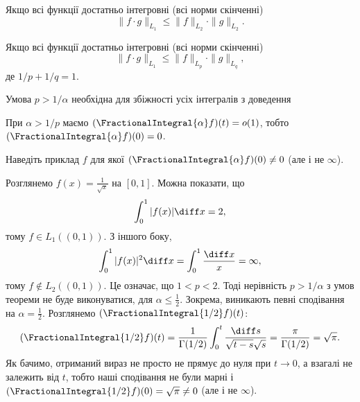 \begin{remark}
    Якщо всі функції достатньо інтегровні (всі норми скінченні)
    \begin{equation}
        \|f \cdot g\|_{L_1} \le \|f\|_{L_2} \cdot \|g\|_{L_2}.  
    \end{equation}
\end{remark}

\begin{remark}
    Якщо всі функції достатньо інтегровні (всі норми скінченні)
    \begin{equation}
        \|f \cdot g\|_{L_1} \le \|f\|_{L_p} \cdot \|g\|_{L_q},  
    \end{equation}
    де $1 / p + 1 / q = 1$.
\end{remark}

\begin{remark}
    Умова $p > 1 / \alpha$ необхідна для збіжності усіх інтегралів з доведення
\end{remark}

\begin{corollary}
    При $\alpha > 1 / p$ маємо $(\FractionalIntegral{\alpha} f)(t) = o(1)$, тобто $(\FractionalIntegral{\alpha} f)(0) = 0$.
\end{corollary}

\begin{exercise}
    Наведіть приклад $f$ для якої $(\FractionalIntegral{\alpha} f)(0) \ne 0$ (але і не $\infty$).
\end{exercise}
\begin{solution}
    \begin{example}
        Розглянемо $f(x) = \frac{1}{\sqrt{x}}$ на $[0,1]$. Можна показати, що
        \begin{equation}
            \int_0^1 |f(x)| \diff x = 2,
        \end{equation}
        тому $f \in L_1((0,1))$. З іншого боку,
        \begin{equation}
            \int_0^1 |f(x)|^2 \diff x = \int_0^1 \frac{\diff x}{x} = \infty,
        \end{equation}
        тому $f \not\in L_2((0,1))$. Це означає, що $1 < p < 2$. Тоді нерівність $p > 1 / \alpha$ з умов теореми не буде виконуватися, для $\alpha \le \frac{1}{2}$. Зокрема, виникають певні сподівання на $\alpha = \frac{1}{2}$. Розглянемо $(\FractionalIntegral{1/2}f)(t)$:
        \begin{equation}
            (\FractionalIntegral{1/2}f)(t) = \frac{1}{\Gamma(1/2)} \int_0^t \frac{\diff s}{\sqrt{t - s} \sqrt{s}} = \frac{\pi}{\Gamma(1/2)} = \sqrt{\pi}.
        \end{equation}
        Як бачимо, отриманий вираз не просто не прямує до нуля при $t \to 0$, а взагалі не залежить від $t$, тобто наші сподівання не були марні і $(\FractionalIntegral{1/2}f)(0) = \sqrt{\pi} \ne 0$ (але і не $\infty$).
    \end{example}
\end{solution}

